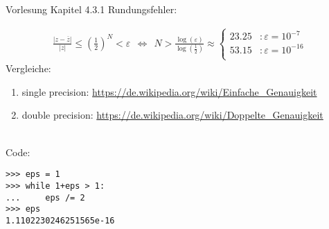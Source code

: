Vorlesung Kapitel 4.3.1 Rundungsfehler:

\begin{align*}
\frac{|z - \overline{z}|}{|z|} \leq \left( \frac{1}{2}\right)^N < \varepsilon~~
\Leftrightarrow~~ N > \frac{\log(\varepsilon)}{\log(\frac{1}{2})} \approx \begin{cases}
23.25 &: \varepsilon=10^{-7} \\
53.15 &: \varepsilon=10^{-16} \\
\end{cases}
\end{align*}
Vergleiche:
\begin{enumerate}
	\item single precision: \url{https://de.wikipedia.org/wiki/Einfache_Genauigkeit}
	\item double precision: \url{https://de.wikipedia.org/wiki/Doppelte_Genauigkeit}
\end{enumerate}
~\\
Code:
\begin{verbatim}
>>> eps = 1
>>> while 1+eps > 1:
...     eps /= 2
>>> eps
1.1102230246251565e-16
\end{verbatim}